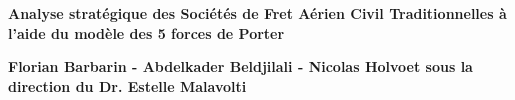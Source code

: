 
\begin{titlepage}
	\parindent=0pt
 
\addtolength{\wpXoffset}{-4.5cm}

	
	\hrulefill
	\begin{center}\bfseries\Huge
		\color{white}
		{Analyse stratégique des Sociétés de Fret Aérien Civil Traditionnelles à l'aide du modèle des 5 forces de Porter} 
	\end{center}
	\hrulefill
	
	\vspace*{1cm}
	\begin{center}\bfseries\Large
			\color{white}
		{Florian Barbarin - Abdelkader Beldjilali - Nicolas Holvoet sous la direction du Dr. Estelle Malavolti  }
		
	\end{center}
	


\end{titlepage}